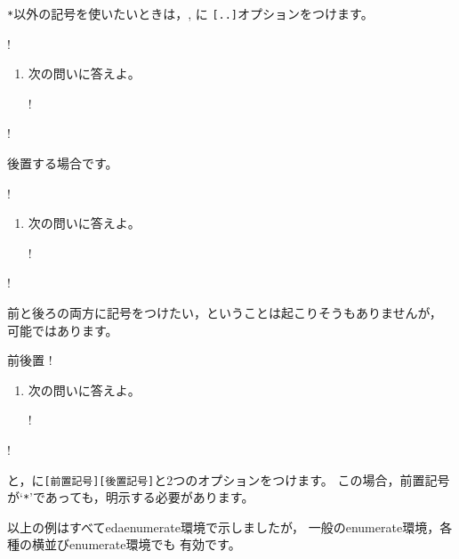 \documentclass[a4j]{jarticle}
\begin{document}
\texttt{*}以外の記号を使いたいときは，,  に
\verb+[..]+オプションをつけます。

\begin{showpEx}{}
!\begin{enumerate}[1.~]
! \item 次の問いに答えよ。
!\end{enumerate}
!\end{showpEx}

後置する場合です。

\begin{showpEx}{}
!\begin{enumerate}[1.~]
! \item 次の問いに答えよ。
!\end{enumerate}
!\end{showpEx}

前と後ろの両方に記号をつけたい，ということは起こりそうもありませんが，
可能ではあります。

\begin{showpEx}{前後置}
!\begin{enumerate}[1.~]
! \item 次の問いに答えよ。
!\end{enumerate}
!\end{showpEx}
と，に\verb+[前置記号][後置記号]+と2つのオプションをつけます。
この場合，前置記号が`\texttt{*}'であっても，明示する必要があります。

以上の例はすべて\textsf{edaenumerate}環境で示しましたが，
一般の\textsf{enumerate}環境，各種の横並び\textsf{enumerate}環境でも
有効です。
\end{document}
